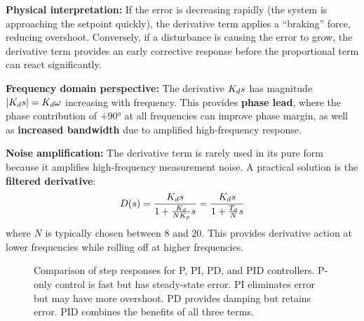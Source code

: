 \textbf{Physical interpretation:} If the error is decreasing rapidly (the system is approaching the setpoint quickly), the derivative term applies a ``braking'' force, reducing overshoot. Conversely, if a disturbance is causing the error to grow, the derivative term provides an early corrective response before the proportional term can react significantly.

\textbf{Frequency domain perspective:} The derivative $K_d s$ has magnitude $|K_d s| = K_d \omega$ increasing with frequency. This provides \textbf{phase lead}, where the phase contribution of $+90°$ at all frequencies can improve phase margin, as well as \textbf{increased bandwidth} due to amplified high-frequency response.

\textbf{Noise amplification:} The derivative term is rarely used in its pure form because it amplifies high-frequency measurement noise. A practical solution is the \textbf{filtered derivative}:
\begin{equation}
D(s) = \frac{K_d s}{1 + \frac{K_d}{NK_p} s} = \frac{K_d s}{1 + \frac{T_d}{N} s}
\label{eq:filtered_derivative}
\end{equation}
where $N$ is typically chosen between 8 and 20. This provides derivative action at lower frequencies while rolling off at higher frequencies.

\begin{figure}[htbp]
\centering
{}
\caption{Comparison of step responses for P, PI, PD, and PID controllers. P-only control is fast but has steady-state error. PI eliminates error but may have more overshoot. PD provides damping but retains error. PID combines the benefits of all three terms.}
\label{fig:step_response_comparison}
\end{figure}

